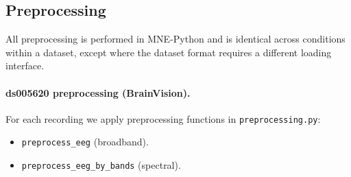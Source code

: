 \documentclass[11pt]{article}
\begin{document}
\subsection{Preprocessing}
All preprocessing is performed in MNE-Python and is identical across conditions within a dataset, except where the dataset format requires a different loading interface.

\paragraph{ds005620 preprocessing (BrainVision).}
For each recording we apply preprocessing functions in \texttt{preprocessing.py}:
\begin{itemize}[leftmargin=*]
    \item \texttt{preprocess\_eeg} (broadband).
    \item \texttt{preprocess\_eeg\_by\_bands} (spectral).
\end{itemize}
\end{document}
